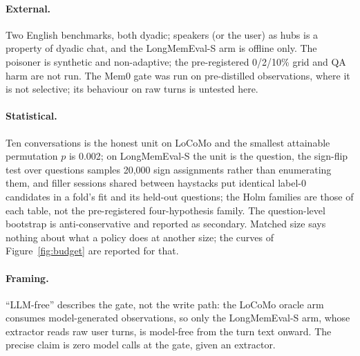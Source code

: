 \documentclass{ceurart}
\begin{document}
\paragraph{External.} Two English benchmarks, both dyadic; speakers (or the user) as hubs is a property of dyadic chat, and the LongMemEval-S arm is offline only. The poisoner is synthetic and non-adaptive; the pre-registered 0/2/10\% grid and QA harm are not run. The Mem0 gate was run on pre-distilled observations, where it is not selective; its behaviour on raw turns is untested here.

\paragraph{Statistical.} Ten conversations is the honest unit on LoCoMo and the smallest attainable permutation $p$ is 0.002; on LongMemEval-S the unit is the question, the sign-flip test over \lmeKHitFitRandom{} questions samples 20,000 sign assignments rather than enumerating them, and filler sessions shared between haystacks put identical label-0 candidates in a fold's fit and its held-out questions; the Holm families are those of each table, not the pre-registered four-hypothesis family. The question-level bootstrap is anti-conservative and reported as secondary. Matched size says nothing about what a policy does at another size; the curves of Figure~\ref{fig:budget} are reported for that.

\paragraph{Framing.} ``LLM-free'' describes the gate, not the write path: the LoCoMo oracle arm consumes model-generated observations, so only the LongMemEval-S arm, whose extractor reads raw user turns, is model-free from the turn text onward. The precise claim is zero model calls at the gate, given an extractor.

\end{document}
